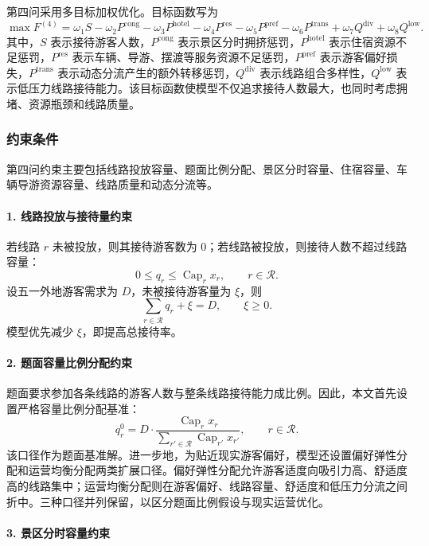 \documentclass[UTF8,zihao=-4,a4paper]{ctexart}
\begin{document}
第四问采用多目标加权优化。目标函数写为
\[
\max F^{(4)}
=
\omega_1 S
-
\omega_2 P^{\mathrm{cong}}
-
\omega_3 P^{\mathrm{hotel}}
-
\omega_4 P^{\mathrm{res}}
-
\omega_5 P^{\mathrm{pref}}
-
\omega_6 P^{\mathrm{trans}}
+
\omega_7 Q^{\mathrm{div}}
+
\omega_8 Q^{\mathrm{low}}.
\]
其中，$S$ 表示接待游客人数，$P^{\mathrm{cong}}$ 表示景区分时拥挤惩罚，$P^{\mathrm{hotel}}$ 表示住宿资源不足惩罚，$P^{\mathrm{res}}$ 表示车辆、导游、摆渡等服务资源不足惩罚，$P^{\mathrm{pref}}$ 表示游客偏好损失，$P^{\mathrm{trans}}$ 表示动态分流产生的额外转移惩罚，$Q^{\mathrm{div}}$ 表示线路组合多样性，$Q^{\mathrm{low}}$ 表示低压力线路接待能力。该目标函数使模型不仅追求接待人数最大，也同时考虑拥堵、资源瓶颈和线路质量。

\subsubsection{约束条件}
\label{subsubsec:q4_constraints}

第四问约束主要包括线路投放容量、题面比例分配、景区分时容量、住宿容量、车辆导游资源容量、线路质量和动态分流等。

\paragraph{1. 线路投放与接待量约束}

若线路 $r$ 未被投放，则其接待游客数为 $0$；若线路被投放，则接待人数不超过线路容量：
\[
0\leq q_r\leq \operatorname{Cap}_r x_r,
\qquad r\in\mathcal{R}.
\]
设五一外地游客需求为 $D$，未被接待游客量为 $\xi$，则
\[
\sum_{r\in\mathcal{R}}q_r+\xi=D,
\qquad \xi\geq 0.
\]
模型优先减少 $\xi$，即提高总接待率。

\paragraph{2. 题面容量比例分配约束}

题面要求参加各条线路的游客人数与整条线路接待能力成比例。因此，本文首先设置严格容量比例分配基准：
\[
q_r^{0}
=
D\cdot
\frac{\operatorname{Cap}_r x_r}
{\sum_{r'\in\mathcal{R}}\operatorname{Cap}_{r'}x_{r'}},
\qquad r\in\mathcal{R}.
\]
该口径作为题面基准解。进一步地，为贴近现实游客偏好，模型还设置偏好弹性分配和运营均衡分配两类扩展口径。偏好弹性分配允许游客适度向吸引力高、舒适度高的线路集中；运营均衡分配则在游客偏好、线路容量、舒适度和低压力分流之间折中。三种口径并列保留，以区分题面比例假设与现实运营优化。

\paragraph{3. 景区分时容量约束}
\end{document}
